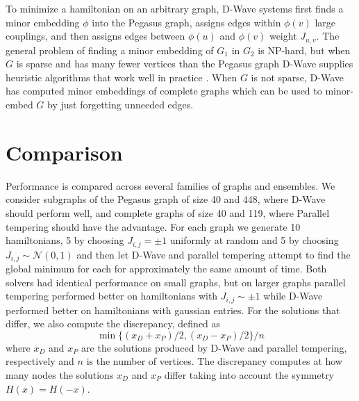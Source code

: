 \documentclass[12pt]{article}
\newcommand{\1}{\mathbf{1}}
\theoremstyle{remark}
\theoremstyle{definition}
\theoremstyle{proposition}
\theoremstyle{lemma}
\theoremstyle{definition}
\begin{document}
	To minimize a hamiltonian on an arbitrary graph, D-Wave systems first finds a minor embedding $\phi$ into the Pegasus graph, assigns edges within $\phi(v)$ large couplings, and then assigns edges between $\phi(u)$ and $\phi(v)$ weight $J_{u, v}$. The general problem of finding a minor embedding of $G_1$ in $G_2$ is NP-hard, but when $G$ is sparse and has many fewer vertices than the Pegasus graph D-Wave supplies heuristic algorithms that work well in practice \cite{cai2014practical}. When $G$ is not sparse, D-Wave has computed minor embeddings of complete graphs which can be used to minor-embed $G$ by just forgetting unneeded edges.
	
	\section{Comparison}
	\indent \indent Performance is compared across several families of graphs and ensembles. We consider subgraphs of the Pegasus graph of size 40 and 448, where D-Wave should perform well, and complete graphs of size 40 and 119, where Parallel tempering should have the advantage. For each graph we generate 10 hamiltonians, 5 by choosing $J_{i, j} = \pm 1$ uniformly at random and 5 by choosing $J_{i, j} \sim \mathcal{N}(0, 1)$ and then let D-Wave and parallel tempering attempt to find the global minimum for each for approximately the same amount of time. Both solvers had identical performance on small graphs, but on larger graphs parallel tempering performed better on hamiltonians with $J_{i, j} \sim \pm 1$ while D-Wave performed better on hamiltonians with gaussian entries. For the solutions that differ, we also compute the discrepancy, defined as
	$$\min \{(x_D + x_P)/2, (x_D - x_P)/2\} / n$$
	where $x_D$ and $x_P$  are the solutions produced by D-Wave and parallel tempering, respectively and $n$ is the number of vertices. The discrepancy computes at how many nodes the solutions $x_D$ and $x_P$ differ taking into account the symmetry $H(x) = H(-x)$. 
	
\end{document}
